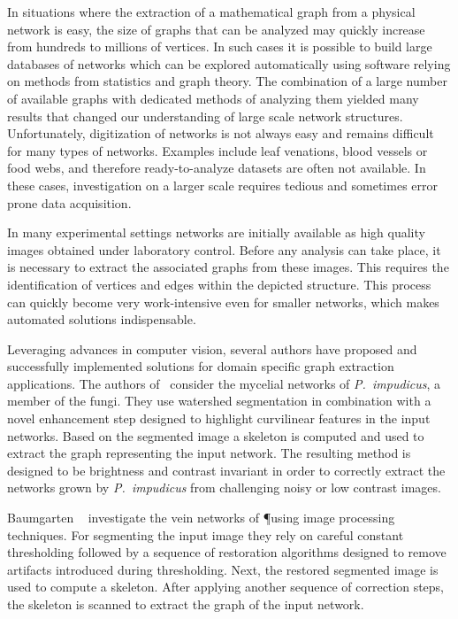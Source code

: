 	In situations where the extraction of a mathematical graph from a physical network is easy, the size of graphs that can be analyzed may quickly increase from hundreds to millions of vertices. In such cases it is possible to build large databases of networks which can be explored automatically using software relying on methods from statistics and graph theory. The combination of a large number of available graphs with dedicated methods of analyzing them yielded many results that changed our understanding of large scale network structures. Unfortunately, digitization of networks is not always easy and remains difficult for many types of networks. Examples include \eg leaf venations, blood vessels or food webs, and therefore ready-to-analyze datasets are often not available. In these cases, investigation on a larger scale requires tedious and sometimes error prone data acquisition.

	In many experimental settings networks are initially available as high quality images obtained under laboratory control. Before any analysis can take place, it is necessary to extract the associated graphs from these images. This requires the identification of vertices and edges within the depicted structure. This process can quickly become very work-intensive even for smaller networks, which makes automated solutions indispensable. 

	Leveraging advances in computer vision, several authors have proposed and successfully implemented solutions for domain specific graph extraction applications. The authors of~\cite{obara2012bioimage,obara2012contrast} consider the mycelial networks of \emph{P.~impudicus}, a member of the fungi. They use watershed segmentation in combination with a novel enhancement step designed to highlight curvilinear features in the input networks. Based on the segmented image a skeleton is computed and used to extract the graph representing the input network. The resulting method is designed to be brightness and contrast invariant in order to correctly extract the networks grown by \emph{P.~impudicus} from challenging noisy or low contrast images.
	
	Baumgarten \etal~\cite{baumgarten2010detection,baumgarten2012computational} investigate the vein networks of \P using image processing techniques. For segmenting the input image they rely on careful constant thresholding followed by a sequence of restoration algorithms designed to remove artifacts introduced during thresholding. Next, the restored segmented image is used to compute a skeleton. After applying another sequence of correction steps, the skeleton is scanned to extract the graph of the input network.
 
